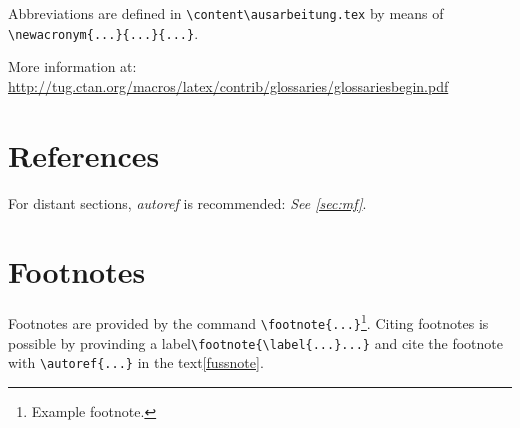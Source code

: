 Abbreviations are defined in \verb+\content\ausarbeitung.tex+ by means of \verb+\newacronym{...}{...}{...}+.

More information at: \url{http://tug.ctan.org/macros/latex/contrib/glossaries/glossariesbegin.pdf}
\section{References}
For distant sections, \textit{autoref} is recommended: \textit{See \autoref{sec:mf}}.



%

\section{Footnotes}
Footnotes are provided by the command \verb+\footnote{...}+\footnote{\label{fussnote}Example footnote.}. Citing footnotes is possible by provinding a label\verb+\footnote{\label{...}...}+ and cite the footnote with \verb+\autoref{...}+ in the text\autoref{fussnote}.

